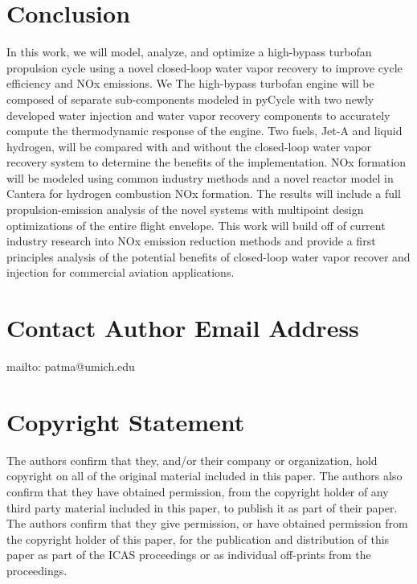 \documentclass[]{icas2022}
\begin{document}
\section{Conclusion}
In this work, we will model, analyze, and optimize a high-bypass turbofan propulsion cycle using a novel closed-loop water vapor recovery to improve cycle efficiency and NOx emissions. We 
The high-bypass turbofan engine will be composed of separate sub-components modeled in pyCycle with two newly developed water injection and water vapor recovery components to accurately compute the thermodynamic response of the engine. Two fuels, Jet-A and liquid hydrogen, will be compared with and without the closed-loop water vapor recovery system to determine the benefits of the implementation. NOx formation will be modeled using common industry methods and a novel reactor model in Cantera for hydrogen combustion NOx formation.
The results will include a full propulsion-emission analysis of the novel systems with multipoint design optimizations of the entire flight envelope.
This work will build off of current industry research into NOx emission reduction methods and provide a first principles analysis of the potential benefits of closed-loop water vapor recover and injection for commercial aviation applications.

\section{Contact Author Email Address}
mailto: patma@umich.edu

\section{Copyright Statement} %
\begin{small}
	The authors confirm that they, and/or their company or organization, hold copyright on all of the original material included in this paper. The authors also confirm that they have obtained permission, from the copyright holder of any third party material included in this paper, to publish it as part of their paper. The authors confirm that they give permission, or have obtained permission from the copyright holder of this paper, for the publication and distribution of this paper as part of the ICAS proceedings or as individual off-prints from the proceedings.
\end{small}



\end{document}

